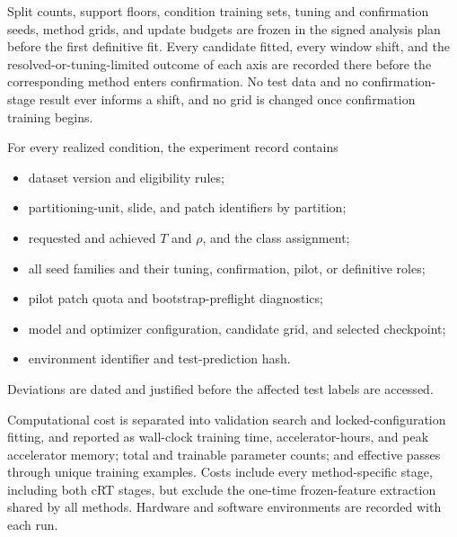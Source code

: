 \documentclass[11pt]{article}
\begin{document}
Split counts, support floors, condition training sets, tuning and confirmation seeds, method grids, and update budgets are frozen in the signed analysis plan before the first definitive fit. Every candidate fitted, every window shift, and the resolved-or-tuning-limited outcome of each axis are recorded there before the corresponding method enters confirmation. No test data and no confirmation-stage result ever informs a shift, and no grid is changed once confirmation training begins.

For every realized condition, the experiment record contains
\begin{itemize}\setlength{\itemsep}{1pt}
  \item dataset version and eligibility rules;
  \item partitioning-unit, slide, and patch identifiers by partition;
  \item requested and achieved $T$ and $\rho$, and the class assignment;
  \item all seed families and their tuning, confirmation, pilot, or definitive roles;
  \item pilot patch quota and bootstrap-preflight diagnostics;
  \item model and optimizer configuration, candidate grid, and selected checkpoint;
  \item environment identifier and test-prediction hash.
\end{itemize}
\noindent Deviations are dated and justified before the affected test labels are accessed.

Computational cost is separated into validation search and locked-configuration fitting, and reported as wall-clock training time, accelerator-hours, and peak accelerator memory; total and trainable parameter counts; and effective passes through unique training examples. Costs include every method-specific stage, including both cRT stages, but exclude the one-time frozen-feature extraction shared by all methods. Hardware and software environments are recorded with each run.
\end{document}
